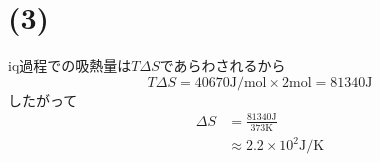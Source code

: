 \section*{(3)}
iq過程での吸熱量は$T \Delta S$であらわされるから
\[T \Delta S = 40670 \text{J/mol} \times 2 \text{mol} = 81340\text{J}\]
したがって
\begin{align*}
  \Delta S 
  &= \frac{81340 \text{J}}{373\text{K}}\\
  &\approx  2.2 \times 10^2 \text{J/K}
\end{align*}







